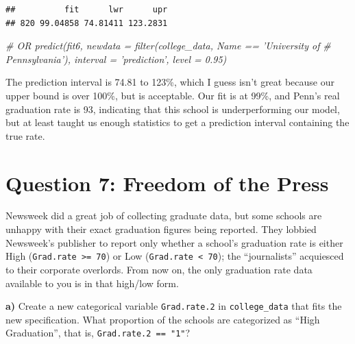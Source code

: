 \documentclass[]{article}
\newenvironment{Shaded}{\begin{snugshade}}{\end{snugshade}}
\newcommand{\KeywordTok}[1]{\textcolor[rgb]{0.13,0.29,0.53}{\textbf{#1}}}
\newcommand{\DataTypeTok}[1]{\textcolor[rgb]{0.13,0.29,0.53}{#1}}
\newcommand{\DecValTok}[1]{\textcolor[rgb]{0.00,0.00,0.81}{#1}}
\newcommand{\StringTok}[1]{\textcolor[rgb]{0.31,0.60,0.02}{#1}}
\newcommand{\CommentTok}[1]{\textcolor[rgb]{0.56,0.35,0.01}{\textit{#1}}}
\newcommand{\OperatorTok}[1]{\textcolor[rgb]{0.81,0.36,0.00}{\textbf{#1}}}
\newcommand{\NormalTok}[1]{#1}
\begin{document}
\begin{verbatim}
##          fit      lwr      upr
## 820 99.04858 74.81411 123.2831
\end{verbatim}

\begin{Shaded}
\begin{Highlighting}[]
\CommentTok{# OR predict(fit6, newdata = filter(college_data, Name == 'University of}
\CommentTok{# Pennsylvania'), interval = 'prediction', level = 0.95)}
\end{Highlighting}
\end{Shaded}

The prediction interval is 74.81 to 123\%, which I guess isn't great
because our upper bound is over 100\%, but is acceptable. Our fit is at
99\%, and Penn's real graduation rate is 93, indicating that this school
is underperforming our model, but at least taught us enough statistics
to get a prediction interval containing the true rate.

\section{Question 7: Freedom of the
Press}\label{question-7-freedom-of-the-press}

Newsweek did a great job of collecting graduate data, but some schools
are unhappy with their exact graduation figures being reported. They
lobbied Newsweek's publisher to report only whether a school's
graduation rate is either High (\texttt{Grad.rate\ \textgreater{}=\ 70})
or Low (\texttt{Grad.rate\ \textless{}\ 70}); the ``journalists''
acquiesced to their corporate overlords. From now on, the only
graduation rate data available to you is in that high/low form.

\textbf{a)} Create a new categorical variable \texttt{Grad.rate.2} in
\texttt{college\_data} that fits the new specification. What proportion
of the schools are categorized as ``High Graduation'', that is,
\texttt{Grad.rate.2\ ==\ "1"}?

\begin{Shaded}
\end{Shaded}
\end{document}
